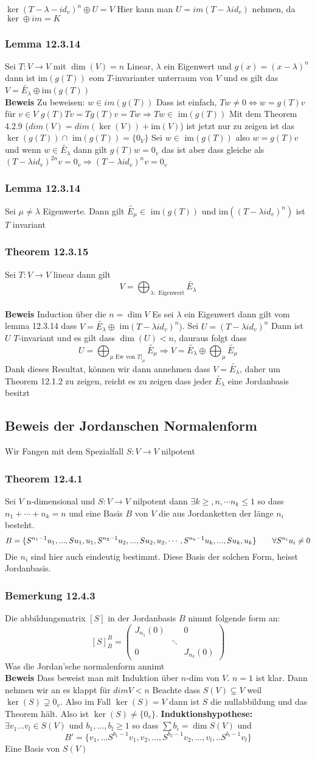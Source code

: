 \documentclass{article}
\newcommand{\mspc}{\hspace{0.7cm}}
\newcommand{\beweis}{\\\textbf{Beweis }}
\newcommand{\bemerkung}[1]{\subsubsection*{Bemerkung {#1}}}
\newcommand{\theorem}[1]{\subsubsection*{Theorem {#1}}}
\newcommand{\lemma}[1]{\subsubsection*{Lemma {#1}}}
\begin{document}
$\ker(T-\lambda -id_v)^n \oplus U =V$ Hier kann man $U=im(T-\lambda id_v)$ nehmen, da $\ker \oplus im = K$
\lemma{12.3.14} Sei $T:V\rightarrow V$ mit $\dim(V)=n$ Linear, $\lambda$ ein Eigenwert und $g(x)=(x-\lambda)^n$ dann ist im$(g(T))$ eom $T$-invarianter unterraum von $V$ und es gilt das $V= \tilde{E_\lambda}\oplus \text{im}(g(T))$
\beweis Zu beweisen: $w\in im(g(T))$ Dass ist einfach, $Tw\neq 0\Leftrightarrow w=g(T)v$ für $v\in V$ $g(T)Tv=Tg(T)v=Tw\Rightarrow Tw\in$ im$(g(T))$
Mit dem Theorem 4.2.9 ($dim(V)=dim(\ker(V))+$im$(V)$) ist jetzt nur zu zeigen ist das $\ker(g(T))\cap$ im$(g(T)) =\lbrace 0_V\rbrace$ Sei $w\in$ im$(g(T))$ also $w=g(T)v$ und wenn $w\in \tilde{E_\lambda}$ dann gilt
$g(T)w=0_v$ das ist aber dass gleiche als $(T-\lambda id_v)^{2n}v=0_v\Rightarrow (T-\lambda id_v)^n v=0_v$
\lemma{12.3.14} Sei $\mu\neq\lambda$ Eigenwerte. Dann gilt $\tilde{E_\mu}\in$  im$(g(T))$ und im$((T-\lambda id_v)^n)$ ist $T$ invariant
\theorem{12.3.15} Sei $T:V\rightarrow V$ linear dann gilt \[V=\bigoplus_{\lambda: \text{ Eigenwert}} \tilde{E_\lambda}\]
\beweis Induction über die $n=\dim V$ Es sei $\lambda$ ein Eigenwert dann gilt vom lemma 12.3.14 dass $V=\tilde{E_\lambda}\oplus$ im$(T-\lambda id_v)^n)$. Sei $U=(T-\lambda id_v)^n$ Dann ist $U$ $T$-invariant und es gilt dass $\dim(U)<n$, dauraus folgt dass \[U =\bigoplus_{\mu\text{ Ew von } T|_{\mu}}\tilde{E_\mu}\Rightarrow V=\tilde{E_\lambda}\oplus\bigoplus_{\mu}\tilde{E_\mu}\] 
Dank dieses Resultat, können wir dann annehmen dass $V=\tilde{E_\lambda}$, daher um Theorem 12.1.2 zu zeigen, reicht es zu zeigen dass jeder $\tilde{E_\lambda}$ eine Jordanbasis besitzt
\subsection*{Beweis der Jordanschen Normalenform}
Wir Fangen mit dem Spezialfall $S:V\rightarrow V$ nilpotent
\theorem{12.4.1} Sei $V$ n-dimensional und $S:V\rightarrow V$ nilpotent dann $\exists k \ge , n, \cdots n_k \le 1$ so dass $n_1+\cdots+n_k=n$ und eine Basis $B$ von $V$ die aus Jordanketten der länge $n_i$ besteht. 
\[B=\lbrace S^{n_1-1}u_1, ..., Su_1, u_1, S^{n_2-1}u_2,..., Su_2, u_2,\cdots ,S^{n_k-1}u_k,..., Su_k, u_k\rbrace \mspc \forall S^{n_i}u_i\neq 0\]
Die $n_i$ sind hier auch eindeutig bestimmt. Diese Basis der solchen Form, heisst Jordanbasis.
\bemerkung{12.4.3}Die abbildungsmatrix $[S]$ in der Jordanbasis $B$ nimmt folgende form an:\[[S]_B^B=\begin{pmatrix}J_{n_1}(0)& & 0\\&\ddots&\\0&&J_{n_k}(0)\end{pmatrix}\] Was die Jordan'sche normalenform annimt
\beweis Dass beweist man mit Induktion über $n$-dim von $V$. $n=1$ ist klar. Dann nehmen wir an es klappt für $dim V<n$ Beachte dass $S(V)\subsetneq V$ weil $\ker(S)\supsetneq 0_v$. Also im Fall $\ker(S)=V$ dann ist $S$ die nullabbildung und das Theorem hält.
Also ist $\ker(S)\neq\lbrace 0_v\rbrace$. \newline
\textbf{Induktionshypothese:} $\exists v_1 ... v_l\in S(V)$ und $b_1, ... ,b_l\ge1$ so dass $\sum b_i=\dim S(V)$ und \[B'=\lbrace v_1, ... S^{b_1-1}v_1, v_2,...,S^{b_2-1}v_2,...,v_l,..S^{b_l -1}v_l\rbrace\] Eine Basis von $S(V)$
\end{document}
